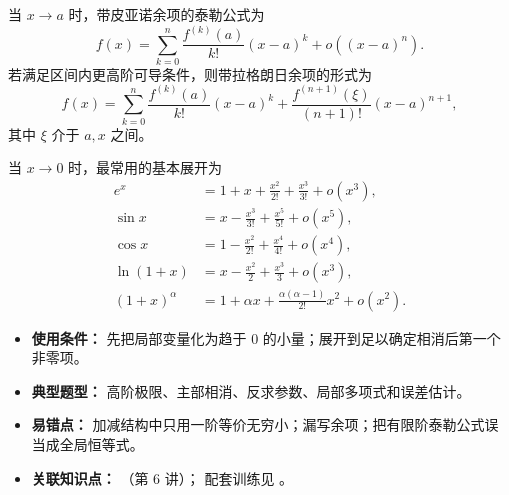 \begin{knowledgeBox}
当 \(x\to a\) 时，带皮亚诺余项的泰勒公式为
\[
f(x)=\sum_{k=0}^{n}\frac{f^{(k)}(a)}{k!}(x-a)^k
+o\!\left((x-a)^n\right).
\]
若满足区间内更高阶可导条件，则带拉格朗日余项的形式为
\[
f(x)=\sum_{k=0}^{n}\frac{f^{(k)}(a)}{k!}(x-a)^k
+\frac{f^{(n+1)}(\xi)}{(n+1)!}(x-a)^{n+1},
\]
其中 \(\xi\) 介于 \(a,x\) 之间。

当 \(x\to0\) 时，最常用的基本展开为
\[
\begin{aligned}
e^x&=1+x+\frac{x^2}{2!}+\frac{x^3}{3!}+o(x^3),\\
\sin x&=x-\frac{x^3}{3!}+\frac{x^5}{5!}+o(x^5),\\
\cos x&=1-\frac{x^2}{2!}+\frac{x^4}{4!}+o(x^4),\\
\ln(1+x)&=x-\frac{x^2}{2}+\frac{x^3}{3}+o(x^3),\\
(1+x)^\alpha&=1+\alpha x+\frac{\alpha(\alpha-1)}{2!}x^2+o(x^2).
\end{aligned}
\]

\begin{itemize}
  \item \textbf{使用条件：} 先把局部变量化为趋于 \(0\) 的小量；展开到足以确定相消后第一个非零项。
  \item \textbf{典型题型：} 高阶极限、主部相消、反求参数、局部多项式和误差估计。
  \item \textbf{易错点：} 加减结构中只用一阶等价无穷小；漏写余项；把有限阶泰勒公式误当成全局恒等式。
  \item \textbf{关联知识点：} （第 6 讲）；
  配套训练见 。
\end{itemize}
\end{knowledgeBox}


